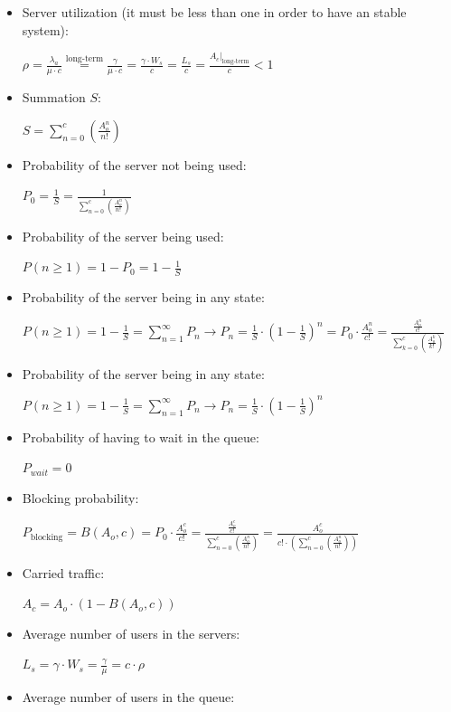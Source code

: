 \documentclass[
	12pt,
	twoside
]{book}
\begin{document}
\begin{itemize}
	\item {
		Server utilization (it must be less than one in order to have an stable system):

		$
			\rho =
			\frac {\lambda_a} {\mu \cdot c} \overset {\textrm{long-term}} {=}
			\frac {\gamma} {\mu \cdot c} =
			\frac {\gamma \cdot W_s} {c} =
			\frac {L_s} {c} =
			\frac {\left. A_c \right|_{\textrm{long-term}}} {c}
			< 1
		$
	}
	\item {
		Summation $S$:

		$
			S = \sum_{n=0}^{c} \left( \frac {A_{o}^n} {n!} \right)
		$
	}
	\item {
		Probability of the server not being used:

		$
			P_0 = \frac {1} {S} = \frac {1} {\sum_{n=0}^{c} \left( \frac {A_{o}^n} {n!} \right)}
		$
	}
	\item {
		Probability of the server being used:

		$
			P(n \geq 1) = 1 - P_0 = 1 - \frac {1} {S}
		$
	}
	\item {
		Probability of the server being in any state:

		$
			P(n \geq 1) = 1 - \frac {1} {S} = \sum_{n=1}^{\infty} P_n \rightarrow
			P_n = \frac {1} {S} \cdot \left( 1 - \frac {1} {S} \right)^n =
			P_0 \cdot \frac {A_{o}^n} {c!} = \frac {\frac{A_{o}^n}{c!}} {\sum_{k=0}^c \left( \frac {A_{o}^k} {k!} \right)}
		$
	}
	\item {
		Probability of the server being in any state:

		$
			P(n \geq 1) = 1 - \frac {1} {S} = \sum_{n=1}^{\infty} P_n \rightarrow
			P_n = \frac {1} {S} \cdot \left( 1 - \frac {1} {S} \right)^n
		$
	}
	\item {
		Probability of having to wait in the queue:

		$
			P_{wait} = 0
		$
	}
	\item {
		Blocking probability:

		$
			P_{\textrm{blocking}} = B(A_o, c) = P_0 \cdot \frac {A_{o}^c} {c!} = \frac {\frac{A_{o}^c}{c!}} {\sum_{n=0}^c \left( \frac {A_{o}^n} {n!} \right)} = \frac {A_{o}^c} { c! \cdot \left( \sum_{n=0}^{c} \left( \frac {A_{o}^n} {n!} \right) \right) }
		$
	}
	\item {
		Carried traffic:

		$
			A_c = A_o \cdot \left( 1 - B(A_o, c) \right)
		$
	}
	\item {
		Average number of users in the servers:

		$
			L_s = \gamma \cdot W_s = \frac {\gamma} {\mu} = c \cdot \rho
		$
	}
	\item {
		Average number of users in the queue:

}
\end{itemize}
\end{document}
